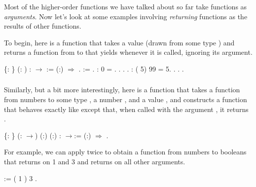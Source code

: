 \documentclass[12pt]{report}
\begin{document}
 Most of the higher-order functions we have talked about so
    far take functions as \textit{arguments}.  Now let's look at some
    examples involving \textit{returning} functions as the results of other
    functions.


    To begin, here is a function that takes a value  (drawn from
    some type ) and returns a function from  to  that
    yields  whenever it is called, ignoring its  argument. \begin{coqdoccode}
\coqdocemptyline
\coqdocnoindent
{}  \{: \} (: ) : \ensuremath{\rightarrow} :=\coqdoceol
\coqdocindent{1.00em}
 (:) \ensuremath{\Rightarrow} .\coqdoceol
\coqdocemptyline
\coqdocnoindent
{}  :=  .\coqdoceol
\coqdocemptyline
\coqdocnoindent
{}  :  0 = .\coqdoceol
\coqdocnoindent
{}. . .\coqdoceol
\coqdocemptyline
\coqdocnoindent
{}  : ( 5) 99 = 5.\coqdoceol
\coqdocnoindent
{}. . .\coqdoceol
\coqdocemptyline
\end{coqdoccode}
\subsubsection{ }

 Similarly, but a bit more interestingly, here is a function
    that takes a function  from numbers to some type , a number
    , and a value , and constructs a function that behaves
    exactly like  except that, when called with the argument ,
    it returns . \begin{coqdoccode}
\coqdocemptyline
\coqdocnoindent
{}  \{: \} (: \ensuremath{\rightarrow}) (:) (:) : \ensuremath{\rightarrow}:=\coqdoceol
\coqdocindent{1.00em}
 (:) \ensuremath{\Rightarrow}         .\coqdoceol
\coqdocemptyline
\end{coqdoccode}
For example, we can apply  twice to obtain a
    function from numbers to booleans that returns  on 1 and
    3 and returns  on all other arguments. \begin{coqdoccode}
\coqdocemptyline
\coqdocnoindent
{}  :=  (  1 ) 3 .\coqdoceol
\coqdocemptyline
\end{coqdoccode}
\end{document}
